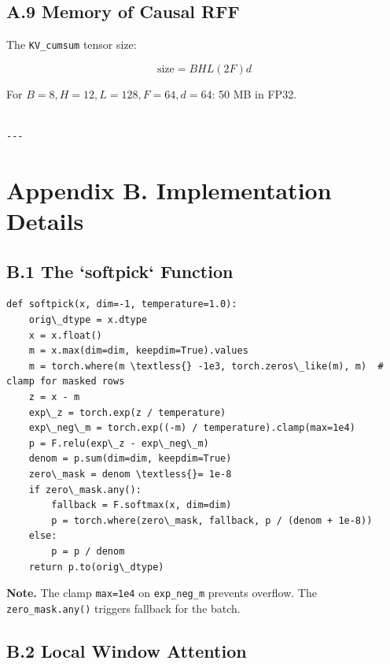 \subsection{A.9 Memory of Causal RFF}

The \texttt{KV\_cumsum} tensor size:

\[
\text{size} = B H L (2F) d
\tag{A.13}
\]

For $B=8, H=12, L=128, F=64, d=64$: 50 MB in FP32.
\begin{lstlisting}

---
\end{lstlisting}


\section{Appendix B. Implementation Details}

\subsection{B.1 The `softpick` Function}

\begin{lstlisting}
def softpick(x, dim=-1, temperature=1.0):
    orig\_dtype = x.dtype
    x = x.float()
    m = x.max(dim=dim, keepdim=True).values
    m = torch.where(m \textless{} -1e3, torch.zeros\_like(m), m)  # clamp for masked rows
    z = x - m
    exp\_z = torch.exp(z / temperature)
    exp\_neg\_m = torch.exp((-m) / temperature).clamp(max=1e4)
    p = F.relu(exp\_z - exp\_neg\_m)
    denom = p.sum(dim=dim, keepdim=True)
    zero\_mask = denom \textless{}= 1e-8
    if zero\_mask.any():
        fallback = F.softmax(x, dim=dim)
        p = torch.where(zero\_mask, fallback, p / (denom + 1e-8))
    else:
        p = p / denom
    return p.to(orig\_dtype)
\end{lstlisting}

\textbf{Note.} The clamp \texttt{max=1e4} on \texttt{exp\_neg\_m} prevents overflow. The 
\texttt{zero\_mask.any()} triggers fallback for the batch.

\subsection{B.2 Local Window Attention}


